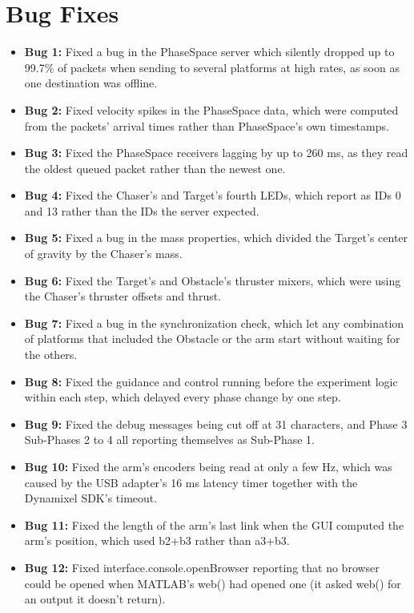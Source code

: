\documentclass[11pt]{article}
\begin{document}
\section*{\textcolor{primaryColor}{Bug Fixes}}
\begin{itemize}[label={\textcolor{primaryColor}{\textbullet}}]
    \item \textbf{Bug 1:} Fixed a bug in the PhaseSpace server which silently dropped up to 99.7\% of packets when sending to several platforms at high rates, as soon as one destination was offline.
    \item \textbf{Bug 2:} Fixed velocity spikes in the PhaseSpace data, which were computed from the packets' arrival times rather than PhaseSpace's own timestamps.
    \item \textbf{Bug 3:} Fixed the PhaseSpace receivers lagging by up to 260 ms, as they read the oldest queued packet rather than the newest one.
    \item \textbf{Bug 4:} Fixed the Chaser's and Target's fourth LEDs, which report as IDs 0 and 13 rather than the IDs the server expected.
    \item \textbf{Bug 5:} Fixed a bug in the mass properties, which divided the Target's center of gravity by the Chaser's mass.
    \item \textbf{Bug 6:} Fixed the Target's and Obstacle's thruster mixers, which were using the Chaser's thruster offsets and thrust.
    \item \textbf{Bug 7:} Fixed a bug in the synchronization check, which let any combination of platforms that included the Obstacle or the arm start without waiting for the others.
    \item \textbf{Bug 8:} Fixed the guidance and control running before the experiment logic within each step, which delayed every phase change by one step.
    \item \textbf{Bug 9:} Fixed the debug messages being cut off at 31 characters, and Phase 3 Sub-Phases 2 to 4 all reporting themselves as Sub-Phase 1.
    \item \textbf{Bug 10:} Fixed the arm's encoders being read at only a few Hz, which was caused by the USB adapter's 16 ms latency timer together with the Dynamixel SDK's timeout.
    \item \textbf{Bug 11:} Fixed the length of the arm's last link when the GUI computed the arm's position, which used b2+b3 rather than a3+b3.
    \item \textbf{Bug 12:} Fixed interface.console.openBrowser reporting that no browser could be opened when MATLAB's web() had opened one (it asked web() for an output it doesn't return).

\end{itemize}
\end{document}
